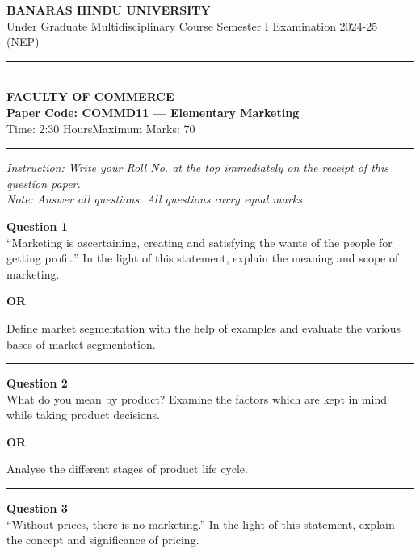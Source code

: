 \documentclass[11pt,a4paper]{article}
\begin{document}
\begin{center}
  {\large\bfseries BANARAS HINDU UNIVERSITY}\\[2pt]
  {\normalsize Under Graduate Multidisciplinary Course Semester I Examination 2024-25 (NEP)}\\[6pt]
  \rule{0.8\linewidth}{0.5pt}\\[6pt]
  {\large\bfseries FACULTY OF COMMERCE}\\[4pt]
  {\large\bfseries Paper Code: COMMD11 --- Elementary Marketing}\\[4pt]
  {\normalsize Time: 2:30 Hours\hfill Maximum Marks: 70}
\end{center}

\rule{\linewidth}{0.4pt}\smallskip



\noindent   \textit{Instruction: Write your Roll No. at the top immediately on the receipt of this question paper.}\\[2pt]



\noindent   \textit{Note: Answer all questions. All questions carry equal marks.}
\bigskip




\noindent   \textbf{Question 1} \\
``Marketing is ascertaining, creating and satisfying the wants of the people for getting profit.'' In the light of this statement, explain the meaning and scope of marketing.


\begin{center}   \textbf{OR}\end{center}

Define market segmentation with the help of examples and evaluate the various bases of market segmentation.

\medskip\rule{\linewidth}{0.2pt}\medskip




\noindent   \textbf{Question 2} \\
What do you mean by product? Examine the factors which are kept in mind while taking product decisions.


\begin{center}   \textbf{OR}\end{center}

Analyse the different stages of product life cycle.

\medskip\rule{\linewidth}{0.2pt}\medskip




\noindent   \textbf{Question 3} \\
``Without prices, there is no marketing.'' In the light of this statement, explain the concept and significance of pricing.
\end{document}
